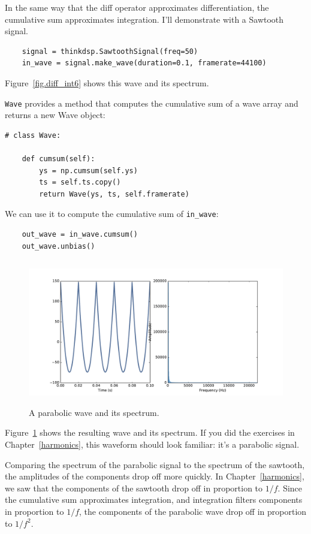 \documentclass[12pt]{book}
\begin{document}
In the same way that the diff operator approximates differentiation,
the cumulative sum approximates integration.
I'll demonstrate with a Sawtooth signal.

\begin{verbatim}
    signal = thinkdsp.SawtoothSignal(freq=50)
    in_wave = signal.make_wave(duration=0.1, framerate=44100)
\end{verbatim}

Figure~\ref{fig.diff_int6} shows this wave and its spectrum.

{\tt Wave} provides a method that computes the cumulative sum of
a wave array and returns a new Wave object:

\begin{verbatim}
# class Wave:

    def cumsum(self):
        ys = np.cumsum(self.ys)
        ts = self.ts.copy()
        return Wave(ys, ts, self.framerate)
\end{verbatim}

We can use it to compute the cumulative sum of \verb"in_wave":

\begin{verbatim}
    out_wave = in_wave.cumsum()
    out_wave.unbias()
\end{verbatim}

\begin{figure}
\centerline{\includegraphics[height=2.5in]{figs/diff_int7.pdf}}
\caption{A parabolic wave and its spectrum.}
\label{fig.diff_int7}
\end{figure}

Figure~\ref{fig.diff_int7} shows the resulting wave and its spectrum.
If you did the exercises in Chapter~\ref{harmonics}, this waveform should
look familiar: it's a parabolic signal.

Comparing the spectrum of the parabolic signal to the spectrum of the
sawtooth, the amplitudes of the components drop off more quickly.  In
Chapter~\ref{harmonics}, we saw that the components of the sawtooth
drop off in proportion to $1/f$.  Since the cumulative sum
approximates integration, and integration filters components in
proportion to $1/f$, the components of the parabolic wave drop off in
proportion to $1/f^2$.
\end{document}

